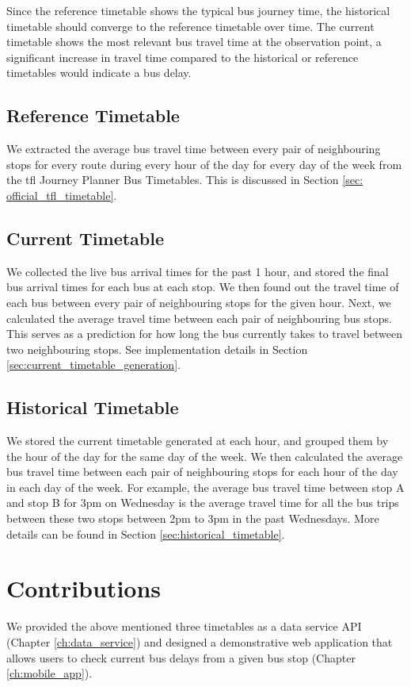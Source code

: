 \par Since the reference timetable shows the typical bus journey time, the historical timetable should converge to the reference timetable over time. The current timetable shows the most relevant bus travel time at the observation point, a significant increase in travel time compared to the historical or reference timetables would indicate a bus delay.

\subsection{Reference Timetable}
\par We extracted the average bus travel time between every pair of neighbouring stops for every route during every hour of the day for every day of the week from the \acrshort{tfl} Journey Planner Bus Timetables. This is discussed in Section \ref{sec: official_tfl_timetable}.

\subsection{Current Timetable}
\par We collected the live bus arrival times for the past 1 hour, and stored the final bus arrival times for each bus at each stop. We then found out the travel time of each bus between every pair of neighbouring stops for the given hour. Next, we calculated the average travel time between each pair of neighbouring bus stops. This serves as a prediction for how long the bus currently takes to travel between two neighbouring stops. See implementation details in Section \ref{sec:current_timetable_generation}.

\subsection{Historical Timetable}
\par We stored the current timetable generated at each hour, and grouped them by the hour of the day for the same day of the week. We then calculated the average bus travel time between each pair of neighbouring stops for each hour of the day in each day of the week. For example, the average bus travel time between stop A and stop B for 3pm on Wednesday is the average travel time for all the bus trips between these two stops between 2pm to 3pm in the past Wednesdays. More details can be found in Section \ref{sec:historical_timetable}.

\section{Contributions}
\par We provided the above mentioned three timetables as a data service API (Chapter \ref{ch:data_service}) and designed a demonstrative web application that allows users to check current bus delays from a given bus stop (Chapter \ref{ch:mobile_app}).


